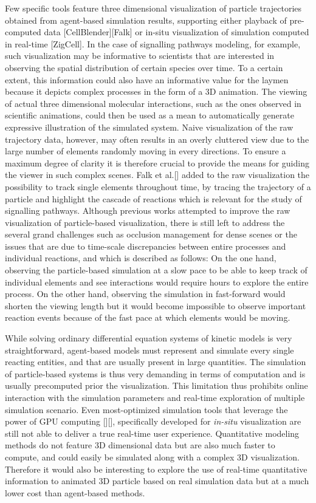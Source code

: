 Few specific tools feature three dimensional visualization of particle trajectories obtained from agent-based simulation results, supporting either playback of pre-computed data [CellBlender][Falk] or in-situ visualization of simulation computed in real-time [ZigCell].
In the case of signalling pathways modeling, for example, such visualization may be informative to scientists that are interested in observing the spatial distribution of certain species over time.
To a certain extent, this information could also have an informative value for the laymen because it depicts complex processes in the form of a 3D animation.
The viewing of actual three dimensional molecular interactions, such as the ones observed in scientific animations, could then be used as a mean to automatically generate expressive illustration of the simulated system.
Naive visualization of the raw trajectory data, however, may often results in an overly cluttered view due to the large number of elements randomly moving in every directions.
To ensure a maximum degree of clarity it is therefore crucial to provide the means for guiding the viewer in such complex scenes. 
Falk et al.[] added to the raw visualization the possibility to track single elements throughout time, by tracing the trajectory of a particle and highlight the cascade of reactions which is relevant for the study of signalling pathways.
Although previous works attempted to improve the raw visualization of particle-based visualization, there is still left to address the several grand challenges such as occlusion management for dense scenes or the issues that are due to time-scale discrepancies between entire processes and individual reactions, and which is described as follows: 
On the one hand, observing the particle-based simulation at a slow pace to be able to keep track of individual elements and see interactions would require hours to explore the entire process.
On the other hand, observing the simulation in fast-forward would shorten the viewing length but it would become impossible to observe important reaction events because of the fast pace at which elements would be moving.

While solving ordinary differential equation systems of kinetic models is very straightforward, agent-based models must represent and simulate every single reacting entities, and that are usually present in large quantities.
The simulation of particle-based systems is thus very demanding in terms of computation and is usually precomputed prior the visualization.
This limitation thus prohibits online interaction with the simulation parameters and real-time exploration of multiple simulation scenario.
Even most-optimized simulation tools that leverage the power of GPU computing [][], specifically developed for \textit{in-situ} visualization are still not able to deliver a true real-time user experience.
Quantitative modeling methods do not feature 3D dimensional data but are also much faster to compute, and could easily be simulated along with a complex 3D visualization.
Therefore it would also be interesting to explore the use of real-time quantitative information to animated 3D particle based on real simulation data but at a much lower cost than agent-based methods.


